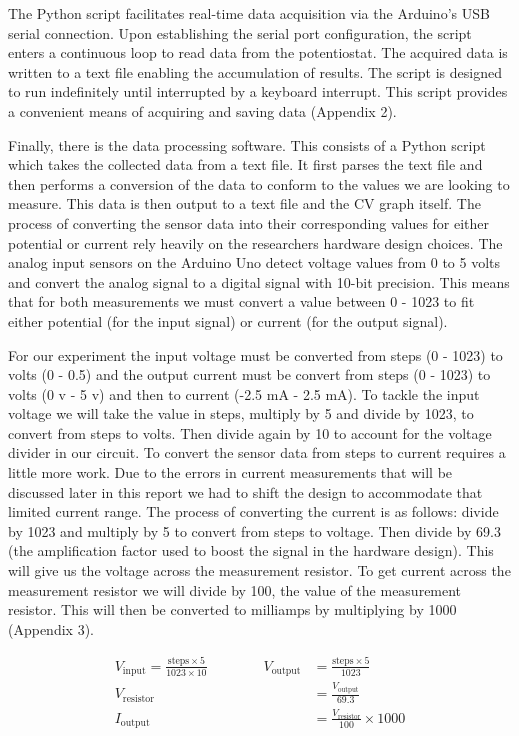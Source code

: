 \documentclass{article}
\begin{document}
The Python script facilitates real-time data acquisition via the Arduino's USB serial connection. Upon establishing the serial port configuration, the script enters a continuous loop to read data from the potentiostat. The acquired data is written to a text file enabling the accumulation of results. The script is designed to run indefinitely until interrupted by a keyboard interrupt. This script provides a convenient means of acquiring and saving data (Appendix 2).


Finally, there is the data processing software. This consists of a Python script which takes the collected data from a text file. It first parses the text file and then performs a conversion of the data to conform to the values we are looking to measure. This data is then output to a text file and the CV graph itself. The process of converting the sensor data into their corresponding values for either potential or current rely heavily on the researchers hardware design choices. The analog input sensors on the Arduino Uno detect voltage values from 0 to 5 volts and convert the analog signal to a digital signal with 10-bit precision. This means that for both measurements we must convert a value between 0 - 1023 to fit either potential (for the input signal) or current (for the output signal).


For our experiment the input voltage must be converted from steps (0 - 1023) to volts (0 - 0.5) and the output current must be convert from steps (0 - 1023) to volts (0 v - 5 v) and then to current (-2.5 mA - 2.5 mA). To tackle the input voltage we will take the value in steps, multiply by 5 and divide by 1023, to convert from steps to volts. Then divide again by 10 to account for the voltage divider in our circuit. To convert the sensor data from steps to current requires a little more work. Due to the errors in current measurements that will be discussed later in this report we had to shift the design to accommodate that limited current range. The process of converting the current is as follows: divide by 1023 and multiply by 5 to convert from steps to voltage. Then divide by 69.3 (the amplification factor used to boost the signal in the hardware design). This will give us the voltage across the measurement resistor. To get current across the measurement resistor we will divide by 100, the value of the measurement resistor. This will then be converted to milliamps by multiplying by 1000 (Appendix 3).


\begin{align*}
  V_{\text{{input}}} = \frac{{\text{{steps}} \times 5}}{{1023 \times 10}} \qquad \qquad 
  V_{\text{{output}}} & = \frac{{\text{{steps}} \times 5}}{{1023}} \\
  V_{\text{{resistor}}} & = \frac{{V_{\text{{output}}}}}{{69.3}} \\
  I_{\text{{output}}} & = \frac{{V_{\text{{resistor}}}}}{{100}} \times 1000
\end{align*}
\end{document}
